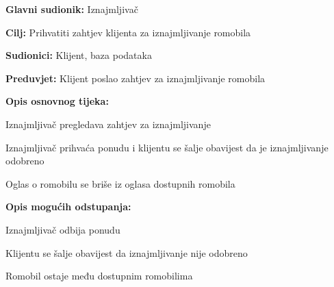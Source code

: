 						\begin{packed_item}
							
							\item \textbf{Glavni sudionik: }Iznajmljivač
							\item  \textbf{Cilj: }Prihvatiti zahtjev klijenta za iznajmljivanje romobila
							\item  \textbf{Sudionici: }Klijent, baza podataka
							\item  \textbf{Preduvjet: }Klijent poslao zahtjev za iznajmljivanje romobila
							\item  \textbf{Opis osnovnog tijeka:}
							
							\item[] \begin{packed_enum}
								
								\item Iznajmljivač pregledava zahtjev za iznajmljivanje 
								\item Iznajmljivač prihvaća ponudu i klijentu se šalje obavijest da je iznajmljivanje odobreno 
								\item Oglas o romobilu se briše iz oglasa dostupnih romobila    
							\end{packed_enum}
							
							\item  \textbf{Opis mogućih odstupanja:}
							
							\item[] \begin{packed_item}
								
								\item[2.a] Iznajmljivač odbija ponudu 
								\item[] \begin{packed_enum}
									
									\item Klijentu se šalje obavijest da iznajmljivanje nije odobreno 
									\item Romobil ostaje među dostupnim romobilima 
									
								\end{packed_enum}
								
							\end{packed_item}
						\end{packed_item}
						\noindent {}
